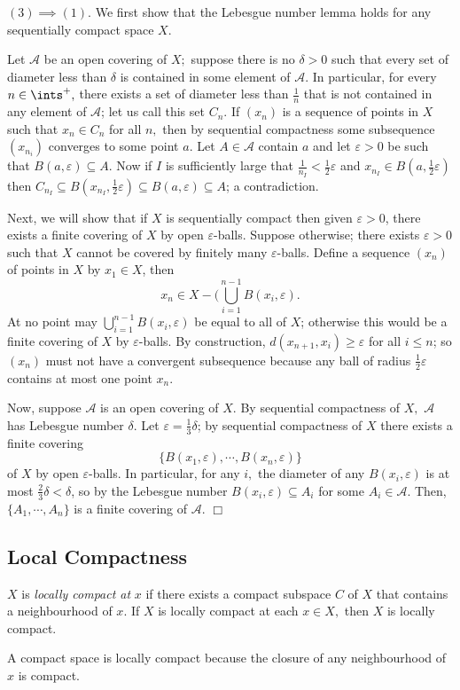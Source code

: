 $(3) \implies (1).$ We first show that the Lebesgue number lemma holds for any sequentially compact space $X.$

Let $\mathcal{A}$ be an open covering of $X;$ suppose there is no $\delta > 0$ such that every set of diameter less than $\delta$ is contained in some element of $\mathcal{A}.$ In particular, for every $n \in \ints^+,$ there exists a set of diameter less than $\frac1n$ that is not contained in any element of $\mathcal{A}$; let us call this set $C_n$. If $(x_n)$ is a sequence of points in $X$ such that $x_n \in C_n$ for all $n,$ then by sequential compactness some subsequence $(x_{n_i})$ converges to some point $a.$ Let $A \in \mathcal{A}$ contain $a$ and let $\varepsilon > 0$ be such that $B(a, \varepsilon) \subseteq A.$ Now if $I$ is sufficiently large that $\frac1{n_I} < \frac12 \varepsilon$ and $x_{n_I} \in B(a, \frac12 \varepsilon)$ then $C_{n_I} \subseteq B(x_{n_I}, \frac12 \varepsilon) \subseteq B(a, \varepsilon) \subseteq A$; a contradiction.

Next, we will show that if $X$ is sequentially compact then given $\varepsilon> 0$, there exists a finite covering of $X$ by open $\varepsilon$-balls. Suppose otherwise; there exists $\varepsilon > 0$ such that $X$ cannot be covered by finitely many $\varepsilon$-balls. Define a sequence $(x_n)$ of points in $X$ by $x_1 \in X$, then 
$$x_n \in X - (\bigcup_{i=1}^{n-1} B(x_i, \varepsilon).$$
At no point may $\bigcup_{i=1}^{n-1} B(x_i, \varepsilon)$ be equal to all of $X$; otherwise this would be a finite covering of $X$ by $\varepsilon$-balls. By construction, $d(x_{n+1}, x_i) \geq \varepsilon$ for all $i\leq n$; so $(x_n)$ must not have a convergent subsequence because any ball of radius $\frac12 \varepsilon$ contains at most one point $x_n.$

Now, suppose $\mathcal{A}$ is an open covering of $X.$ By sequential compactness of $X,$ $\mathcal{A}$ has Lebesgue number $\delta.$ Let $\varepsilon = \frac13 \delta$; by sequential compactness of $X$ there exists a finite covering
$$\{B(x_1, \varepsilon), \cdots, B(x_n, \varepsilon)\}$$
of $X$ by open $\varepsilon$-balls. In particular, for any $i,$ the diameter of any $B(x_i, \varepsilon)$ is at most $\frac23 \delta < \delta$, so by the Lebesgue number $B(x_i, \varepsilon) \subseteq A_i$ for some $A_i \in \mathcal{A}$. Then, $\{A_1, \cdots, A_n\}$ is a finite covering of $\mathcal{A}.$ $\Box$

\subsection{Local Compactness}
\begin{definition}\label{3.49}
    $X$ is {\it locally compact at} $x$ if there exists a compact subspace $C$ of $X$ that contains a neighbourhood of $x.$ If $X$ is locally compact at each $x \in X,$ then $X$ is locally compact.
\end{definition}
A compact space is locally compact because the closure of any neighbourhood of $x$ is compact.

